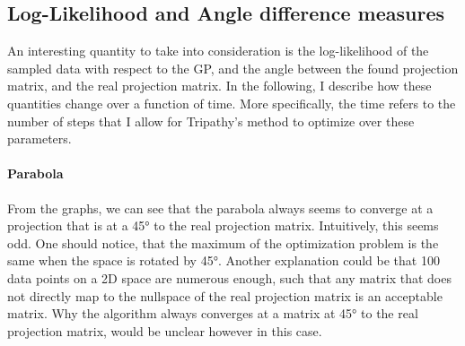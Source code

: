 \subsection{Log-Likelihood and Angle difference measures}

An interesting quantity to take into consideration is the log-likelihood of the sampled data with respect to the GP, and the angle between the found projection matrix, and the real projection matrix.
In the following, I describe how these quantities change over a function of time.
More specifically, the time refers to the number of steps that I allow for Tripathy's method to optimize over these parameters.

\paragraph{Parabola}

From the graphs, we can see that the parabola always seems to converge at a projection that is at a 45° to the real projection matrix. 
Intuitively, this seems odd.
One should notice, that the maximum of the optimization problem is the same when the space is rotated by 45°.
Another explanation could be that 100 data points on a 2D space are numerous enough, such that any matrix that does not directly map to the nullspace of the real projection matrix is an acceptable matrix.
Why the algorithm always converges at a matrix at 45° to the real projection matrix, would be unclear however in this case.

